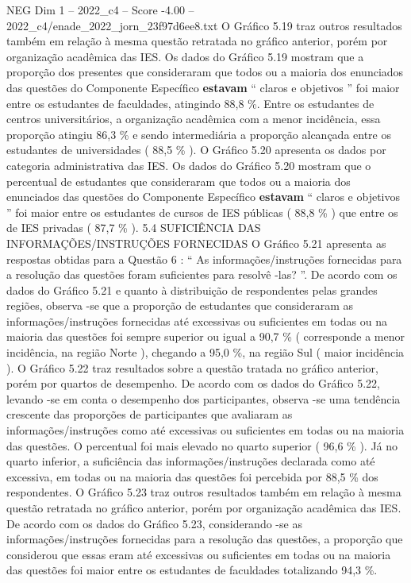 \begin{textsample}{NEG Dim 1 – 2022\_c4 – Score -4.00 – 2022\_c4/enade\_2022\_jorn\_23f97d6ee8.txt}
O Gráfico 5.19 traz outros resultados também em relação à mesma questão retratada no gráfico anterior, porém por organização acadêmica das IES.
Os dados do Gráfico 5.19 mostram que a proporção dos presentes que consideraram que todos ou a maioria dos enunciados das questões do Componente Específico \textbf{estavam} “ claros e objetivos ” foi maior entre os estudantes de faculdades, atingindo 88,8 \%.
Entre os estudantes de centros universitários, a organização acadêmica com a menor incidência, essa proporção atingiu 86,3 \% e sendo intermediária a proporção alcançada entre os estudantes de universidades ( 88,5 \% ).
O Gráfico 5.20 apresenta os dados por categoria administrativa das IES.
Os dados do Gráfico 5.20 mostram que o percentual de estudantes que consideraram que todos ou a maioria dos enunciados das questões do Componente Específico \textbf{estavam} “ claros e objetivos ” foi maior entre os estudantes de cursos de IES públicas ( 88,8 \% ) que entre os de IES privadas ( 87,7 \% ). 5.4 SUFICIÊNCIA DAS INFORMAÇÕES/INSTRUÇÕES FORNECIDAS O Gráfico 5.21 apresenta as respostas obtidas para a Questão 6 : “ As informações/instruções fornecidas para a resolução das questões foram suficientes para resolvê -las? ”.
De acordo com os dados do Gráfico 5.21 e quanto à distribuição de respondentes pelas grandes regiões, observa -se que a proporção de estudantes que consideraram as informações/instruções fornecidas até excessivas ou suficientes em todas ou na maioria das questões foi sempre superior ou igual a 90,7 \% ( corresponde a menor incidência, na região Norte ), chegando a 95,0 \%, na região Sul ( maior incidência ).
O Gráfico 5.22 traz resultados sobre a questão tratada no gráfico anterior, porém por quartos de desempenho.
De acordo com os dados do Gráfico 5.22, levando -se em conta o desempenho dos participantes, observa -se uma tendência crescente das proporções de participantes que avaliaram as informações/instruções como até excessivas ou suficientes em todas ou na maioria das questões.
O percentual foi mais elevado no quarto superior ( 96,6 \% ).
Já no quarto inferior, a suficiência das informações/instruções declarada como até excessiva, em todas ou na maioria das questões foi percebida por 88,5 \% dos respondentes.
O Gráfico 5.23 traz outros resultados também em relação à mesma questão retratada no gráfico anterior, porém por organização acadêmica das IES.
De acordo com os dados do Gráfico 5.23, considerando -se as informações/instruções fornecidas para a resolução das questões, a proporção que considerou que essas eram até excessivas ou suficientes em todas ou na maioria das questões foi maior entre os estudantes de faculdades totalizando 94,3 \%.

\end{textsample}

